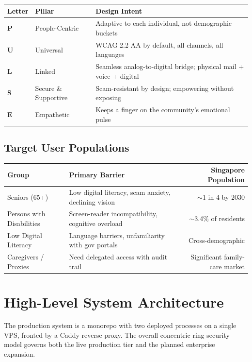 \documentclass[12pt,a4paper]{article}
\begin{document}
\begin{tabular}{@{}lll@{}}
\toprule
\textbf{Letter} & \textbf{Pillar} & \textbf{Design Intent} \\
\midrule
\textbf{P} & People-Centric   & Adaptive to each individual, not demographic buckets \\
\textbf{U} & Universal        & WCAG 2.2 AA by default, all channels, all languages \\
\textbf{L} & Linked           & Seamless analog-to-digital bridge; physical mail + voice + digital \\
\textbf{S} & Secure \& Supportive & Scam-resistant by design; empowering without exposing \\
\textbf{E} & Empathetic        & Keeps a finger on the community's emotional pulse \\
\bottomrule
\end{tabular}

\subsection{Target User Populations}

\begin{tabular}{@{}llr@{}}
\toprule
\textbf{Group} & \textbf{Primary Barrier} & \textbf{Singapore Population} \\
\midrule
Seniors (65+)             & Low digital literacy, scam anxiety, declining vision & $\sim$1 in 4 by 2030 \\
Persons with Disabilities & Screen-reader incompatibility, cognitive overload & $\sim$3.4\% of residents \\
Low Digital Literacy      & Language barriers, unfamiliarity with gov portals & Cross-demographic \\
Caregivers / Proxies      & Need delegated access with audit trail & Significant family-care market \\
\bottomrule
\end{tabular}

\section{High-Level System Architecture}
\label{sec:highlevel}

The production system is a monorepo with two deployed processes on a single VPS,
fronted by a Caddy reverse proxy. The overall concentric-ring security model governs
both the live production tier and the planned enterprise expansion.
\end{document}
